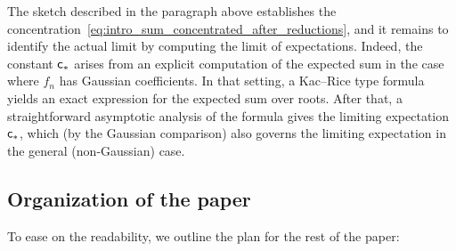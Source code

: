 \documentclass[11pt]{amsart}
\theoremstyle{remark}
\theoremstyle{definition}
\begin{document}
    The sketch described in the paragraph above establishes the concentration~\eqref{eq:intro_sum_concentrated_after_reductions}, and it remains to identify the actual limit by computing the limit of expectations. Indeed, the constant ${\sf c}_\ast$ arises from an explicit computation of the expected sum in the case where $f_n$ has Gaussian coefficients. In that setting, a Kac–Rice type formula yields an exact expression for the expected sum over roots. After that, a straightforward asymptotic analysis of the formula gives the limiting expectation ${\sf c}_\ast$, which (by the Gaussian comparison) also governs the limiting expectation in the general (non-Gaussian) case.
    
    \subsection*{Organization of the paper}
    To ease on the readability, we outline the plan for the rest of the paper: 
\end{document}
